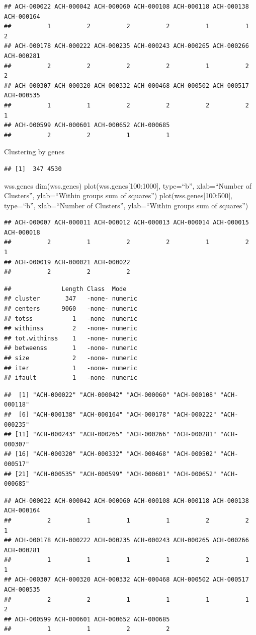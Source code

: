 \documentclass[
]{article}
\begin{document}
\begin{verbatim}
## ACH-000022 ACH-000042 ACH-000060 ACH-000108 ACH-000118 ACH-000138 ACH-000164 
##          1          2          2          2          1          1          2 
## ACH-000178 ACH-000222 ACH-000235 ACH-000243 ACH-000265 ACH-000266 ACH-000281 
##          2          2          2          2          1          2          2 
## ACH-000307 ACH-000320 ACH-000332 ACH-000468 ACH-000502 ACH-000517 ACH-000535 
##          1          1          2          2          2          2          1 
## ACH-000599 ACH-000601 ACH-000652 ACH-000685 
##          2          2          1          1
\end{verbatim}

Clustering by genes

\begin{verbatim}
## [1]  347 4530
\end{verbatim}

wss.genes dim(wss.genes) plot(wss.genes{[}100:1000{]}, type=``b'',
xlab=``Number of Clusters'', ylab=``Within groups sum of squares'')
plot(wss.genes{[}100:500{]}, type=``b'', xlab=``Number of Clusters'',
ylab=``Within groups sum of squares'')

\begin{verbatim}
## ACH-000007 ACH-000011 ACH-000012 ACH-000013 ACH-000014 ACH-000015 ACH-000018 
##          2          1          2          2          1          2          1 
## ACH-000019 ACH-000021 ACH-000022 
##          2          2          2
\end{verbatim}

\begin{verbatim}
##              Length Class  Mode   
## cluster       347   -none- numeric
## centers      9060   -none- numeric
## totss           1   -none- numeric
## withinss        2   -none- numeric
## tot.withinss    1   -none- numeric
## betweenss       1   -none- numeric
## size            2   -none- numeric
## iter            1   -none- numeric
## ifault          1   -none- numeric
\end{verbatim}

\begin{verbatim}
##  [1] "ACH-000022" "ACH-000042" "ACH-000060" "ACH-000108" "ACH-000118"
##  [6] "ACH-000138" "ACH-000164" "ACH-000178" "ACH-000222" "ACH-000235"
## [11] "ACH-000243" "ACH-000265" "ACH-000266" "ACH-000281" "ACH-000307"
## [16] "ACH-000320" "ACH-000332" "ACH-000468" "ACH-000502" "ACH-000517"
## [21] "ACH-000535" "ACH-000599" "ACH-000601" "ACH-000652" "ACH-000685"
\end{verbatim}

\begin{verbatim}
## ACH-000022 ACH-000042 ACH-000060 ACH-000108 ACH-000118 ACH-000138 ACH-000164 
##          2          1          1          1          2          2          1 
## ACH-000178 ACH-000222 ACH-000235 ACH-000243 ACH-000265 ACH-000266 ACH-000281 
##          1          1          1          1          2          1          1 
## ACH-000307 ACH-000320 ACH-000332 ACH-000468 ACH-000502 ACH-000517 ACH-000535 
##          2          2          1          1          1          1          2 
## ACH-000599 ACH-000601 ACH-000652 ACH-000685 
##          1          1          2          2
\end{verbatim}
\end{document}
